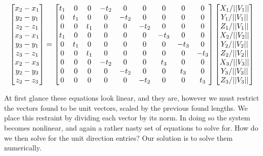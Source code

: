\documentclass[a4paper]{article}
\begin{document}
\begin{equation}
\resizebox{\linewidth}{!}{$
\begin{bmatrix}
x_2 - x_1 \\
y_2 - y_1 \\
z_2 - z_1 \\
x_3 - x_1 \\
y_3 - y_1 \\
z_3 - z_1 \\
x_2 - x_3 \\
y_2 - y_3 \\
z_2 - z_3 
\end{bmatrix} = 
\begin{bmatrix}
t_1 & 0   & 0   &-t_2 & 0   & 0   & 0   & 0   & 0   \\
0   & t_1 & 0   & 0   &-t_2 & 0   & 0   & 0   & 0   \\
0   & 0   & t_1 & 0   & 0   &-t_2 & 0   & 0   & 0   \\
t_1 & 0   & 0   & 0   & 0   & 0   &-t_3 & 0   & 0   \\
0   & t_1 & 0   & 0   & 0   & 0   & 0   &-t_3 & 0   \\
0   & 0   & t_1 & 0   & 0   & 0   & 0   & 0   &-t_3 \\
0   & 0   & 0   &-t_2 & 0   & 0   & t_3 & 0   & 0   \\
0   & 0   & 0   & 0   &-t_2 & 0   & 0   & t_3 & 0   \\
0   & 0   & 0   & 0   & 0   &-t_2 & 0   & 0   & t_3 
\end{bmatrix}
\begin{bmatrix}
X_1/||V_1||\\
Y_1/||V_1||\\
Z_1/||V_1||\\
X_2/||V_2||\\
Y_2/||V_2||\\
Z_2/||V_2||\\
X_3/||V_3||\\
Y_3/||V_3||\\
Z_3/||V_3||
\end{bmatrix} $}
\end{equation}

At first glance these equations look linear, and they are, however we must restrict the vectors found to be unit vectors, scaled by the previous found lengths. We place this restraint by dividing each vector by its norm. In doing so the system becomes nonlinear, and again a rather nasty set of equations to solve for. How do we then solve for the unit direction entries? Our solution is to solve them numerically.
\end{document}
